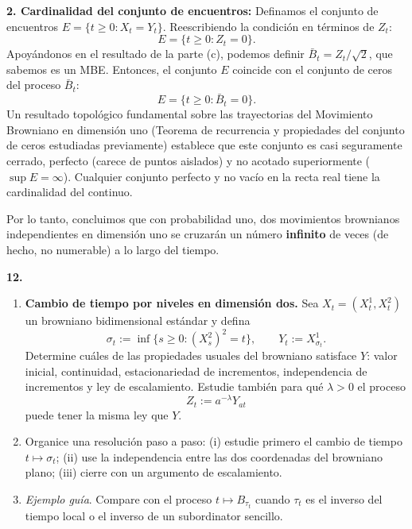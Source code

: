 \documentclass[11pt, letterpaper]{article}
\begin{document}
\begin{solucion}
    \textbf{2. Cardinalidad del conjunto de encuentros:}
    Definamos el conjunto de encuentros $E = \{t \ge 0 : X_t = Y_t\}$.
    Reescribiendo la condición en términos de $Z_t$:
    \[ E = \{t \ge 0 : Z_t = 0\}. \]
    Apoyándonos en el resultado de la parte (c), podemos definir $\bar{B}_t = Z_t / \sqrt{2}$, que sabemos es un MBE. 
    Entonces, el conjunto $E$ coincide con el conjunto de ceros del proceso $\bar{B}_t$:
    \[ E = \{t \ge 0 : \bar{B}_t = 0\}. \]
    Un resultado topológico fundamental sobre las trayectorias del Movimiento Browniano en dimensión uno (Teorema de recurrencia y propiedades del conjunto de ceros estudiadas previamente) establece que este conjunto es casi seguramente cerrado, perfecto (carece de puntos aislados) y no acotado superiormente ($\sup E = \infty$).
    Cualquier conjunto perfecto y no vacío en la recta real tiene la cardinalidad del continuo.
    
    Por lo tanto, concluimos que con probabilidad uno, dos movimientos brownianos independientes en dimensión uno se cruzarán un número \textbf{infinito} de veces (de hecho, no numerable) a lo largo del tiempo.
\end{solucion}

\newpage

\begin{ejercicio}
    \textbf{12.} 
    \begin{enumerate}
        \item \textbf{Cambio de tiempo por niveles en dimensión dos.} Sea $X_t = (X_t^1, X_t^2)$ un browniano bidimensional estándar y defina
        \[ \sigma_t := \inf\{s \ge 0 : (X_s^2)^2 = t\}, \qquad Y_t := X_{\sigma_t}^1. \]
        Determine cuáles de las propiedades usuales del browniano satisface $Y$: valor inicial, continuidad, estacionariedad de incrementos, independencia de incrementos y ley de escalamiento. Estudie también para qué $\lambda > 0$ el proceso
        \[ Z_t := a^{-\lambda} Y_{at} \]
        puede tener la misma ley que $Y$.
        \item Organice una resolución paso a paso: (i) estudie primero el cambio de tiempo $t \mapsto \sigma_t$; (ii) use la independencia entre las dos coordenadas del browniano plano; (iii) cierre con un argumento de escalamiento.
        \item \textit{Ejemplo guía}. Compare con el proceso $t \mapsto B_{\tau_t}$ cuando $\tau_t$ es el inverso del tiempo local o el inverso de un subordinator sencillo.
    \end{enumerate}
\end{ejercicio}
\end{document}
